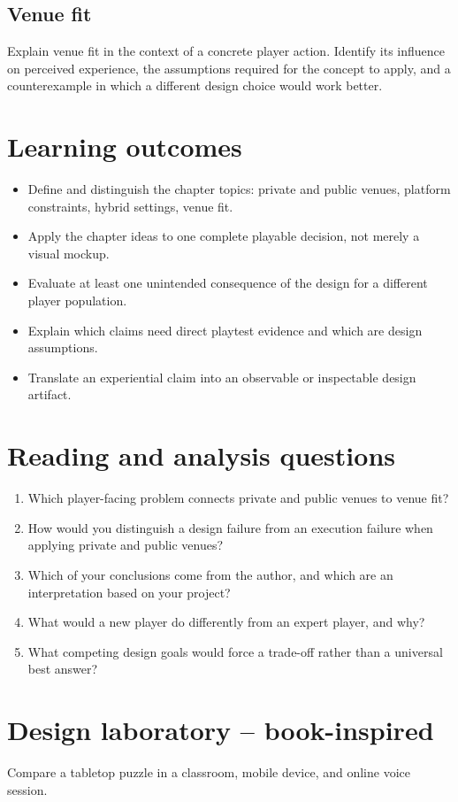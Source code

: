 \documentclass[11pt]{article}
\begin{document}
\subsection{Venue fit}
Explain venue fit in the context of a concrete player action. Identify its influence on perceived experience, the assumptions required for the concept to apply, and a counterexample in which a different design choice would work better.


\section{Learning outcomes}
\begin{itemize}
\item Define and distinguish the chapter topics: private and public venues, platform constraints, hybrid settings, venue fit.
\item Apply the chapter ideas to one complete playable decision, not merely a visual mockup.
\item Evaluate at least one unintended consequence of the design for a different player population.
\item Explain which claims need direct playtest evidence and which are design assumptions.
\item Translate an experiential claim into an observable or inspectable design artifact.
\end{itemize}

\section{Reading and analysis questions}
\begin{enumerate}
\item Which player-facing problem connects private and public venues to venue fit?
\item How would you distinguish a design failure from an execution failure when applying private and public venues?
\item Which of your conclusions come from the author, and which are an interpretation based on your project?
\item What would a new player do differently from an expert player, and why?
\item What competing design goals would force a trade-off rather than a universal best answer?
\end{enumerate}

\section{Design laboratory -- book-inspired}
Compare a tabletop puzzle in a classroom, mobile device, and online voice session.
\end{document}
